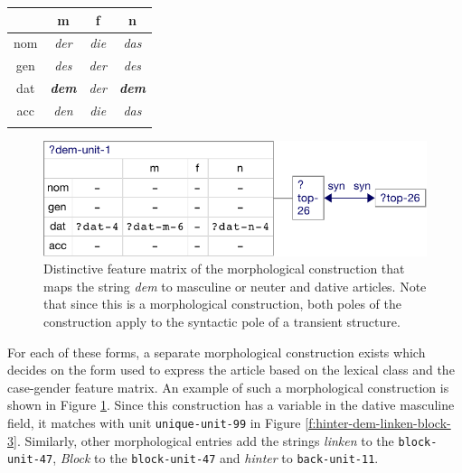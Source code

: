 \begin{center}
  \begin{tabular}{cccc}
  	\lsptoprule
    & m & f & n \\ \midrule
    nom  & \emph{der} & \emph{die} & \emph{das} \\
    gen  & \emph{des} & \emph{der} & \emph{des} \\
    dat & \bf{\emph{dem}} & \emph{der} & \bf{\emph{dem}} \\
    acc & \emph{den} & \emph{die} & \emph{das} \\ 
	\lspbottomrule
  \end{tabular}
\end{center}

\begin{figure}[t]
  \centerline{\includegraphics[scale=0.65]{figs/dem-morph-fvm}}
  \caption[Distinctive feature matrix of a morphological construction]{
  Distinctive feature matrix of the morphological construction
    that maps the string \textit{dem} to masculine or neuter and dative
    articles. Note that since this is a morphological construction, both
    poles of the construction apply to the syntactic pole of a transient
    structure.}
  \label{f:dem-morph}
\end{figure}

For each of these forms, a separate morphological construction exists
which decides on the form used to express the article
based on the lexical class and the case-gender feature matrix. An example of such a
morphological construction is shown in Figure \ref{f:dem-morph}. Since
this construction has a variable in the dative masculine field, it
matches with unit {\footnotesize\texttt{unique-unit-99}} in Figure
\ref{f:hinter-dem-linken-block-3}. Similarly, other morphological
entries add the strings \textit{linken} to the {\footnotesize\texttt{block-unit-47}},
\textit{Block} to the {\footnotesize\texttt{block-unit-47}} and \textit{hinter} to
{\footnotesize\texttt{back-unit-11}}.

